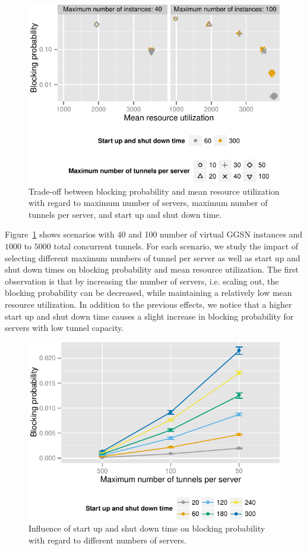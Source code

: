 \begin{figure}[htb]
  \centering
  \includegraphics{images/compare-util-block.pdf}
  \caption{Trade-off between blocking probability and mean resource utilization with regard to maximum number of servers, maximum number of tunnels per server, and start up and shut down time.}
 \label{c4:fig:compare_util_block}
\end{figure}

Figure~\ref{c4:fig:compare_util_block} shows scenarios with 40 and 100 number of virtual \gls{GGSN} instances and  $1000$ to $5000$ total concurrent tunnels. For each scenario, we study the impact of selecting different maximum numbers of tunnel per server as well as start up and shut down times on blocking probability and mean resource utilization. The first observation is that by increasing the number of servers, i.e. scaling out, the blocking probability can be decreased, while maintaining a relatively low mean resource utilization. In addition to the previous effects, we notice that a higher start up and shut down time causes a slight increase in blocking probability for servers with low tunnel capacity.

\begin{figure}[htb]
  \centering
  \includegraphics{images/compare-maxinstances-block.pdf}
  \caption{Influence of start up and shut down time on blocking probability with regard to different numbers of servers.}
 \label{c4:fig:compare_maxinstances_block}
\end{figure}

